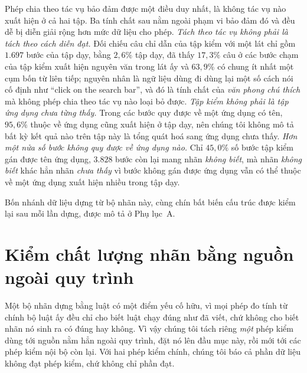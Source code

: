 \documentclass[12pt,a4paper,onecolumn]{article}
\newcommand{\ôvuông}[2]{\tikz[baseline=-0.45ex]{\draw[#1,line width=0.9pt,#2] (0,0) rectangle (0.34,0.18);}}
\begin{document}
Phép chia theo tác vụ bảo đảm được một điều duy nhất, là không tác vụ nào xuất hiện ở cả
hai tập. Ba tính chất sau nằm ngoài phạm vi bảo đảm đó và đều dễ bị diễn giải rộng hơn mức
dữ liệu cho phép. \emph{Tách theo tác vụ không phải là tách theo cách diễn đạt.} Đối chiếu câu chỉ dẫn của
tập kiểm với một lát chỉ gồm $1.697$ bước của tập dạy, bằng $2{,}6\%$ tập dạy, đã thấy $17{,}3\%$ câu ở các bước chạm của tập kiểm xuất hiện nguyên văn trong lát ấy
và $63{,}9\%$ có chung ít nhất một cụm bốn từ liên tiếp; nguyên nhân là ngữ liệu dùng đi
dùng lại một số cách nói cố định như ``click on the search bar'', và đó là tính chất của
\emph{văn phong chú thích} mà không phép chia theo tác vụ nào loại bỏ được. \emph{Tập kiểm không phải là tập ứng dụng chưa từng thấy.} Trong các bước quy được về một
ứng dụng có tên, $95{,}6\%$ thuộc về ứng dụng cũng xuất hiện ở tập dạy, nên chúng tôi không mô tả bất
kỳ kết quả nào trên tập này là tổng quát hoá sang ứng dụng chưa thấy. \emph{Hơn một nửa số bước không quy được về ứng dụng nào.} Chỉ $45{,}0\%$ số bước tập
kiểm gán được tên ứng dụng, $3.828$ bước còn lại mang nhãn \emph{không biết}, mà nhãn \emph{không biết} khác hẳn
nhãn \emph{chưa thấy} vì bước không gán được ứng dụng vẫn có thể thuộc về một ứng
dụng xuất hiện nhiều trong tập dạy.

Bốn nhánh dữ liệu dựng từ bộ nhãn này, cùng chín bất biến cấu trúc được kiểm lại sau mỗi
lần dựng, được mô tả ở Phụ lục~A.

\section{Kiểm chất lượng nhãn bằng nguồn ngoài quy trình}
\label{sec:kiem}

Một bộ nhãn dựng bằng luật có một điểm yếu cố hữu, vì mọi phép đo tính từ chính bộ luật ấy
đều chỉ cho biết luật chạy đúng như đã viết, chứ không cho biết nhãn nó sinh ra có đúng
hay không. Vì vậy chúng tôi tách riêng \emph{một} phép kiểm dùng tới nguồn nằm hẳn
ngoài quy trình, đặt nó lên đầu mục này, rồi mới tới các phép kiểm nội bộ còn lại. Với hai phép kiểm chính, chúng tôi báo cả phần dữ liệu không đạt phép kiểm, chứ không chỉ
phần đạt.
\end{document}
